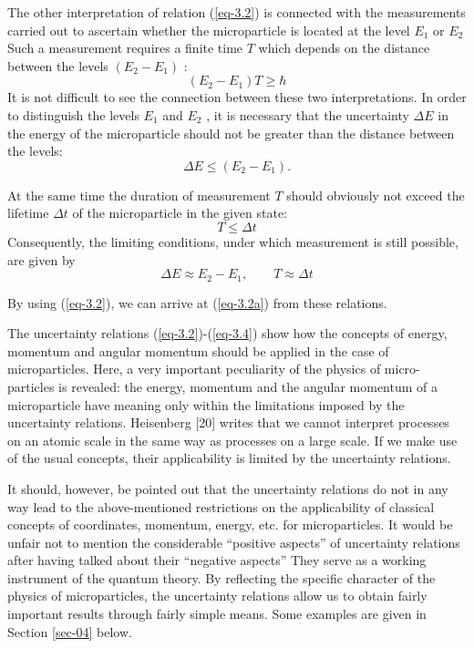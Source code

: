 \documentclass[a4paper,sfsidenotes,colorlinks=true]{tufte-book}
\numberwithin{equation}{section}
\numberwithin{figure}{section}
\begin{document}
The other interpretation of relation (\ref{eq-3.2}) is connected with the
measurements carried out to ascertain whether the microparticle is
located at the level $E_{1}$ or $E_{2}$ Such a measurement requires a finite
time $T$ which depends on the distance between the levels $(E_{2}- E_{1})$ :
\begin{equation}%
(E_{2} - E_{1}) T \geqslant  \hbar  
\tag{3.2a}
\label{eq-3.2a} 
\end{equation}
It is not difficult to see the connection between these two
interpretations. In order to distinguish the levels $E_{1}$ and $E_{2}$ , it is
necessary that the uncertainty $\Delta E$ in the energy of the microparticle
should not be greater than the distance between the levels:
\begin{equation*}
\Delta E \leqslant (E_{2} - E_{1}). 
\end{equation*}

At the same time the duration of measurement $T$ should obviously not
exceed the lifetime $\Delta t$ of the microparticle in the given state:
\begin{equation*}
T \leqslant  \Delta t
\end{equation*}
Consequently, the limiting conditions, under which measurement is
still possible, are given by
\begin{equation*}
\Delta E \approx E_{2} - E_{1}, \quad \quad  T \approx  \Delta t
\end{equation*}

By using (\ref{eq-3.2}), we can arrive at (\ref{eq-3.2a}) from these relations.

The uncertainty relations (\ref{eq-3.2})-(\ref{eq-3.4}) show how the
concepts of energy, momentum and angular momentum should be applied in
the case of microparticles. Here, a very important peculiarity of the
physics of micro- particles is revealed: the energy, momentum and the
angular momentum of a microparticle have meaning only within the
limitations imposed by the uncertainty relations. Heisenberg [20]
writes that we cannot interpret processes on an atomic scale in the
same way as processes on a large scale. If we make use of the usual
concepts, their applicability is limited by the uncertainty relations.

It should, however, be pointed out that the uncertainty relations do
not in any way lead to the above-mentioned restrictions on the
applicability of classical concepts of coordinates, momentum, energy,
etc. for microparticles. It would be unfair not to mention the
considerable ``positive aspects'' of uncertainty relations after
having talked about their ``negative aspects'' They serve as a working
instrument of the quantum theory. By reflecting the specific
character of the physics of microparticles, the uncertainty
relations allow us to obtain fairly important results through fairly
simple means. Some examples are given in Section \ref{sec-04} below.
\end{document}

